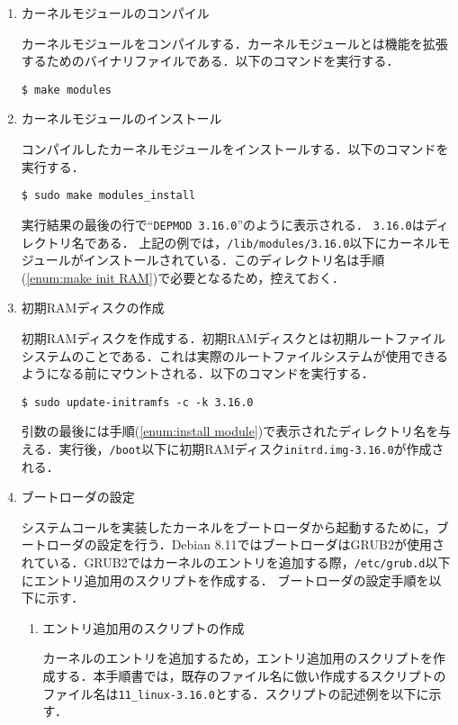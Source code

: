 \documentclass[12pt]{jsarticle}
\begin{document}
\begin{enumerate}
\item カーネルモジュールのコンパイル \label{enum:compile module}

カーネルモジュールをコンパイルする．カーネルモジュールとは機能を拡張するためのバイナリファイルである．以下のコマンドを実行する．
\begin{verbatim}
$ make modules
\end{verbatim}

\item カーネルモジュールのインストール \label{enum:install module}

コンパイルしたカーネルモジュールをインストールする．以下のコマンドを実行する．
\begin{verbatim}
$ sudo make modules_install
\end{verbatim}
実行結果の最後の行で``\verb|DEPMOD 3.16.0|''のように表示される．
\verb|3.16.0|はディレクトリ名である．
上記の例では，\verb|/lib/modules/3.16.0|以下にカーネルモジュールがインストールされている．このディレクトリ名は手順(\ref{enum:make init RAM})で必要となるため，控えておく．

\item 初期RAMディスクの作成 \label{enum:make init RAM}

初期RAMディスクを作成する．初期RAMディスクとは初期ルートファイルシステムのことである．これは実際のルートファイルシステムが使用できるようになる前にマウントされる．以下のコマンドを実行する．
\begin{verbatim}
$ sudo update-initramfs -c -k 3.16.0
\end{verbatim}
引数の最後には手順(\ref{enum:install module})で表示されたディレクトリ名を与える．実行後，\verb|/boot|以下に初期RAMディスク\verb|initrd.img-3.16.0|が作成される．

\item ブートローダの設定 \label{enum:setting bootloader}

システムコールを実装したカーネルをブートローダから起動するために，ブートローダの設定を行う．Debian 8.11ではブートローダはGRUB2が使用されている．GRUB2ではカーネルのエントリを追加する際，\verb|/etc/grub.d|以下にエントリ追加用のスクリプトを作成する．
ブートローダの設定手順を以下に示す．

\begin{enumerate}

\item エントリ追加用のスクリプトの作成 \label{enum:make entry script}

カーネルのエントリを追加するため，エントリ追加用のスクリプトを作成する．本手順書では，既存のファイル名に倣い作成するスクリプトのファイル名は\verb|11_linux-3.16.0|とする．スクリプトの記述例を以下に示す．


\end{enumerate}
\end{enumerate}
\end{document}
